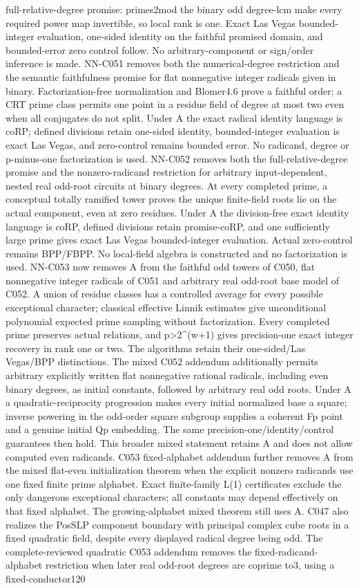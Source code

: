 full-relative-degree promise: primes2mod the binary odd degree-lcm make every required power map invertible, so local rank is one. Exact Las Vegas bounded-integer evaluation, one-sided identity on the faithful promised domain, and bounded-error zero control follow. No arbitrary-component or sign/order inference is made. NN-C051 removes both the numerical-degree restriction and the semantic faithfulness promise for flat nonnegative integer radicals given in binary. Factorization-free normalization and Blomer4.6 prove a faithful order; a CRT prime class permits one point in a residue field of degree at most two even when all conjugates do not split. Under A the exact radical identity language is coRP; defined divisions retain one-sided identity, bounded-integer evaluation is exact Las Vegas, and zero-control remains bounded error. No radicand, degree or p-minus-one factorization is used. NN-C052 removes both the full-relative-degree promise and the nonzero-radicand restriction for arbitrary input-dependent, nested real odd-root circuits at binary degrees. At every completed prime, a conceptual totally ramified tower proves the unique finite-field roots lie on the actual component, even at zero residues. Under A the division-free exact identity language is coRP, defined divisions retain promise-coRP, and one sufficiently large prime gives exact Las Vegas bounded-integer evaluation. Actual zero-control remains BPP/FBPP. No local-field algebra is constructed and no factorization is used. NN-C053 now removes A from the faithful odd towers of C050, flat nonnegative integer radicals of C051 and arbitrary real odd-root base model of C052. A union of residue classes has a controlled average for every possible exceptional character; classical effective Linnik estimates give unconditional polynomial expected prime sampling without factorization. Every completed prime preserves actual relations, and p>2\textasciicircum{}(w+1) gives precision-one exact integer recovery in rank one or two. The algorithms retain their one-sided/Las Vegas/BPP distinctions. The mixed C052 addendum additionally permits arbitrary explicitly written flat nonnegative rational radicals, including even binary degrees, as initial constants, followed by arbitrary real odd roots. Under A a quadratic-reciprocity progression makes every initial normalized base a square; inverse powering in the odd-order square subgroup supplies a coherent Fp point and a genuine initial Qp embedding. The same precision-one/identity/control guarantees then hold. This broader mixed statement retains A and does not allow computed even radicands. C053 fixed-alphabet addendum further removes A from the mixed flat-even initialization theorem when the explicit nonzero radicands use one fixed finite prime alphabet. Exact finite-family L(1) certificates exclude the only dangerous exceptional characters; all constants may depend effectively on that fixed alphabet. The growing-alphabet mixed theorem still uses A. C047 also realizes the PosSLP component boundary with principal complex cube roots in a fixed quadratic field, despite every displayed radical degree being odd. The complete-reviewed quadratic C053 addendum removes the fixed-radicand-alphabet restriction when later real odd-root degrees are coprime to3, using a fixed-conductor120 
